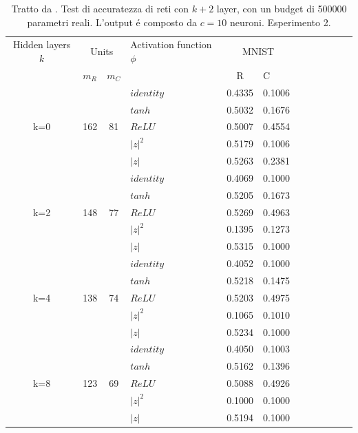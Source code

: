 \documentclass[a4paper,12pt]{report}
\begin{document}
 
 \begin{table}
  \centering
  \begin{tabular}{cp{} cp{} cp{}   cp{} cp{} cp{}}
   \cline{1-6}
   Hidden layers $k$ & \multicolumn{2}{c}{Units} $p_R$ & Activation function $\phi$ & \multicolumn{2}{c}{MNIST}\\
   \cline{2-3} \cline{5-6}
   & $m_R$ & $m_C$ & & R & C \\
   \cline{1-6}
   & & & $identity$ & 0.4335 & 0.1006 \\
   \cline{4-6}
   & & & $tanh$ & 0.5032 & 0.1676 \\
   \cline{4-6}
   k=0 & 162 & 81 & $ReLU$ & 0.5007 & 0.4554 \\
   \cline{4-6}
   & & & $|z|^2$ & 0.5179 & 0.1006 \\
   \cline{4-6}
   & & & $|z|$ & 0.5263 & 0.2381 \\
   \cline{1-6}
   
   \cline{1-6}
   & & & $identity$ & 0.4069 & 0.1000 \\
   \cline{4-6}
   & & & $tanh$ & 0.5205 & 0.1673 \\
   \cline{4-6}
   k=2 & 148 & 77 & $ReLU$ & 0.5269 & 0.4963 \\
   \cline{4-6}
   & & & $|z|^2$ & 0.1395 & 0.1273 \\
   \cline{4-6}
   & & & $|z|$ & 0.5315 & 0.1000 \\
   \cline{1-6}
   
   \cline{1-6}
   & & & $identity$ & 0.4052 & 0.1000 \\
   \cline{4-6}
   & & & $tanh$ & 0.5218 & 0.1475 \\
   \cline{4-6}
   k=4 & 138 & 74 & $ReLU$ & 0.5203 & 0.4975 \\
   \cline{4-6}
   & & & $|z|^2$ & 0.1065 & 0.1010 \\
   \cline{4-6}
   & & & $|z|$ & 0.5234 & 0.1000 \\
   \cline{1-6}
   
   \cline{1-6}
   & & & $identity$ & 0.4050 & 0.1003 \\
   \cline{4-6}
   & & & $tanh$ & 0.5162 & 0.1396 \\
   \cline{4-6}
   k=8 & 123 & 69 & $ReLU$ & 0.5088 & 0.4926 \\
   \cline{4-6}
   & & & $|z|^2$ & 0.1000 & 0.1000 \\
   \cline{4-6}
   & & & $|z|$ & 0.5194 & 0.1000 \\
   \cline{1-6}
      
  \end{tabular}
  \caption{Tratto da \cite{monning2018evaluation}. Test di accuratezza di reti con $k+2$ layer, con un budget di 500000 parametri reali. L'output \'e composto da $c=10$ neuroni. Esperimento 2.}
  \label{MNIST2Tab}
 \end{table}
 
\end{document}
